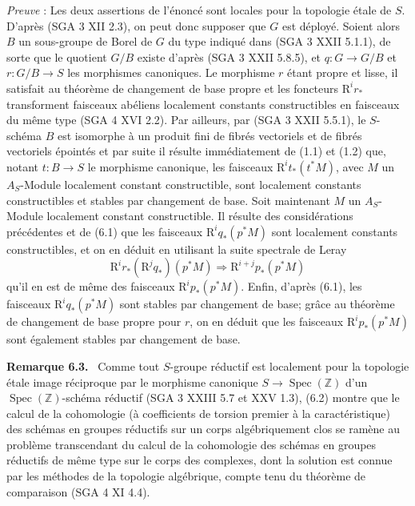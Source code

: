 \documentclass[11pt]{article}
\newenvironment{statement}[1]{\par\medskip\noindent\textbf{#1.}\ }{\par\medskip}
\begin{document}
\emph{Preuve} : Les deux assertions de l'énoncé sont locales pour la topologie étale de $S$. D'après (SGA 3 XII 2.3), on peut donc supposer que $G$ est déployé. Soient alors $B$ un sous-groupe de Borel de $G$ du type indiqué dans (SGA 3 XXII 5.1.1), de sorte que le quotient $G/B$ existe d'après (SGA 3 XXII 5.8.5), et $q:G\to G/B$ et $r:G/B\to S$ les morphismes canoniques. Le morphisme $r$ étant propre et lisse, il satisfait au théorème de changement de base propre et les foncteurs $\mathrm{R}^ir_*$ transforment faisceaux abéliens localement constants constructibles en faisceaux du même type (SGA 4 XVI 2.2). Par ailleurs, par (SGA 3 XXII 5.5.1), le $S$-schéma $B$ est isomorphe à un produit fini de fibrés vectoriels et de fibrés vectoriels épointés et par
suite il résulte immédiatement de (1.1) et (1.2) que, notant $t:B\to S$ le morphisme canonique, les 
faisceaux $\mathrm{R}^it_*(t^*M)$, avec $M$ un $A_S$-Module localement constant constructible, sont localement constants constructibles et stables par changement de base. Soit maintenant $M$ un $A_S$-Module localement constant constructible. Il résulte des considérations précédentes et de (6.1) que les faisceaux $\mathrm{R}^iq_*(p^*M)$ sont localement constants constructibles, et on en déduit en utilisant la suite spectrale de Leray
\[
\mathrm{R}^ir_*(\mathrm{R}^jq_*)(p^*M)\Rightarrow \mathrm{R}^{i+j}p_*(p^*M)
\]
qu'il en est de même des faisceaux $\mathrm{R}^ip_*(p^*M)$. Enfin, d'après (6.1), les faisceaux $\mathrm{R}^iq_*(p^*M)$ sont stables par changement de base; grâce au théorème de changement de base propre pour $r$, on en déduit que les faisceaux $\mathrm{R}^ip_*(p^*M)$ sont également stables par changement de base.

\begin{statement}{Remarque 6.3}
Comme tout $S$-groupe réductif est localement pour la topologie étale image réciproque par le morphisme canonique $S\to\operatorname{Spec}(\mathbb Z)$ d'un $\operatorname{Spec}(\mathbb Z)$-schéma réductif (SGA 3 XXIII 5.7 et XXV 1.3), (6.2) montre que le calcul de la cohomologie (à coefficients de torsion premier à la caractéristique) des schémas en groupes réductifs sur un corps algébriquement clos se ramène au problème transcendant du calcul de la cohomologie des schémas en groupes réductifs de même type sur le corps des complexes, dont la solution est connue par les méthodes de la topologie algébrique, compte tenu du théorème de comparaison (SGA 4 XI 4.4).
\end{statement}
\end{document}
